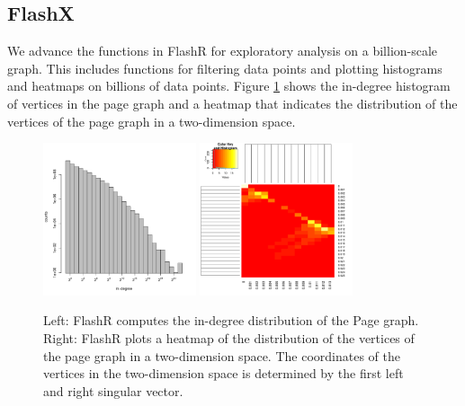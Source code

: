 \documentclass[simplex.tex]{subfiles}
\begin{document}
\subsection{FlashX}

We advance the functions in FlashR for exploratory analysis on a billion-scale
graph. This includes functions for filtering data points and plotting
histograms and heatmaps on billions of data points. Figure \ref{fig:FlashX}
shows the in-degree histogram of vertices in the page graph and a heatmap
that indicates the distribution of the vertices of the page graph in
a two-dimension space.

\begin{figure}[!h]
\begin{cframed}
\centering
\includegraphics[width=0.4\textwidth]{../../figs/hist-indeg.pdf}
\includegraphics[width=0.4\textwidth]{../../figs/pg_xy_heatmap.pdf}
\caption{Left: FlashR computes the in-degree distribution of the Page graph.
	Right: FlashR plots a heatmap of the distribution of the vertices of
	the page graph in a two-dimension space. The coordinates of the vertices
	in the two-dimension space is determined by the first left and right
	singular vector.}
\label{fig:FlashX}
\end{cframed}
\end{figure}

\clearpage
\end{document}
